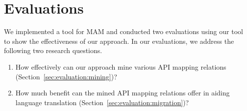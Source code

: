 \section{Evaluations}
\label{sec:evaluation}

We implemented a tool for MAM and
conducted two evaluations using our tool to show the effectiveness
of our approach. In our evaluations, we address the following
two research questions.

\vspace*{-1.5ex}
\begin{enumerate}
\item How effectively can our approach mine various API mapping relations
(Section~\ref{sec:evaluation:mining})? \vspace*{-1.8ex}
\item How much benefit can the mined API mapping relations offer in aiding language
translation (Section~\ref{sec:evaluation:migration})?\vspace*{-1.6ex}

\end{enumerate}%
